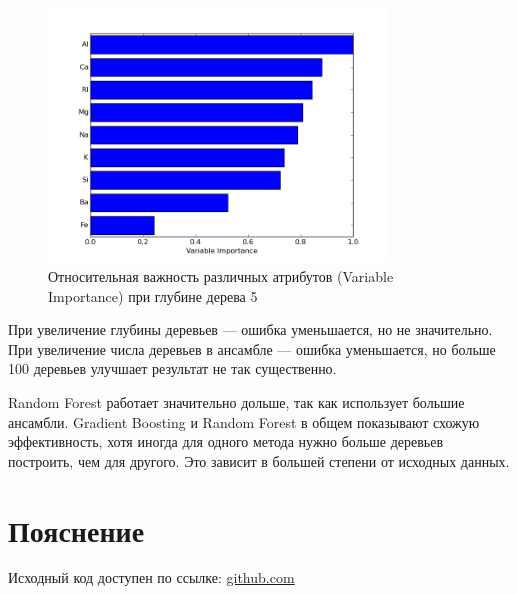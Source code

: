 \documentclass{article} %
\begin{document}
\begin{figure}[H]
    \centering
    \includegraphics[width=0.8\textwidth]{varImpBG5depth}
    \caption{Относительная важность различных атрибутов
    (Variable Importance) при глубине дерева 5}
\end{figure}

При увеличение глубины деревьев ---
ошибка уменьшается, но не значительно.
При увеличение числа деревьев в ансамбле ---
ошибка уменьшается, но больше 100 деревьев
улучшает результат не так существенно.

Random Forest работает значительно дольше,
так как использует большие ансамбли.
Gradient Boosting и Random Forest в общем показывают
схожую эффективность, хотя иногда для одного метода
нужно больше деревьев построить, чем для другого.
Это зависит в большей степени от исходных данных.

\section{Пояснение}
Исходный код доступен по ссылке:
\href{https://github.com/SvichkarevAnatoly/Course-Python-Bioinformatics/tree/master/semester2/task10}
{github.com}
\end{document}
